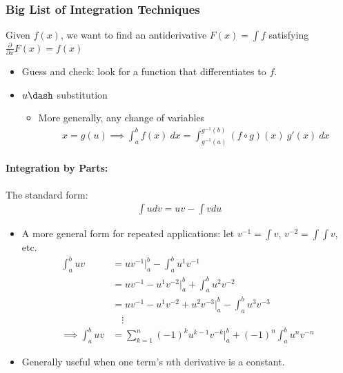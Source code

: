 \hypertarget{big-list-of-integration-techniques}{%
\subsubsection{Big List of Integration
Techniques}\label{big-list-of-integration-techniques}}

Given \(f(x)\), we want to find an antiderivative \(F(x) = \int f\)
satisfying \(\frac{\partial}{\partial x}F(x) = f(x)\)

\begin{itemize}
\tightlist
\item
  Guess and check: look for a function that differentiates to \(f\).
\item
  \(u\dash\) substitution

  \begin{itemize}
  \tightlist
  \item
    More generally, any change of variables
    \begin{align*}
    x = g(u) \implies \int_a^b f(x)~dx = \int_{g^{-1}(a)}^{g^{-1}(b)} (f\circ g)(x) ~g'(x)~dx
    \end{align*}
  \end{itemize}
\end{itemize}

\hypertarget{integration-by-parts}{%
\paragraph{Integration by Parts:}\label{integration-by-parts}}

The standard form:
\begin{align*}
\int u dv = uv - \int v du
\end{align*}

\begin{itemize}
\tightlist
\item
  A more general form for repeated applications: let
  \(v^{-1} = \int v\), \(v^{-2} = \int\int v\), etc.
  \begin{align*}
  \int_a^b uv &= uv^{-1}\bigg\rvert_a^b  - \int_a^b u^{1} v^{-1}\\
  &= uv^{-1} - u^1v^{-2}\bigg\rvert_a^b + \int_a^b u^2v^{-2} \\
  &= uv^{-1} - u^1v^{-2} + u^2v^{-3}\bigg\rvert_a^b - \int_a^b u^3v^{-3} \\
  &\quad\vdots \\
  \implies \int_a^b uv &= \sum_{k=1}^n (-1)^k u^{k-1}v^{-k} \bigg\rvert_a^b + (-1)^n\int_a^b u^nv^{-n} 
  \end{align*}
\item
  Generally useful when one term's \(n\)th derivative is a constant.
\end{itemize}

